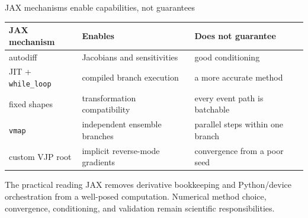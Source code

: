 \begin{frame}{JAX mechanisms enable capabilities, not guarantees}
\scriptsize
\begin{center}
\begin{tabular}{>{\raggedright\arraybackslash}p{}
                >{\raggedright\arraybackslash}p{}
                >{\raggedright\arraybackslash}p{}}
\toprule
JAX mechanism & Enables & Does not guarantee\\
\midrule
autodiff & Jacobians and sensitivities & good conditioning\\
JIT + \texttt{while\_loop} & compiled branch execution & a more accurate method\\
fixed shapes & transformation compatibility & every event path is batchable\\
\texttt{vmap} & independent ensemble branches & parallel steps within one branch\\
custom VJP root & implicit reverse-mode gradients & convergence from a poor seed\\
\bottomrule
\end{tabular}
\end{center}
\vspace{4mm}
\begin{block}{The practical reading}
JAX removes derivative bookkeeping and Python/device orchestration from a
well-posed computation. Numerical method choice, convergence, conditioning,
and validation remain scientific responsibilities.
\end{block}
\end{frame}
